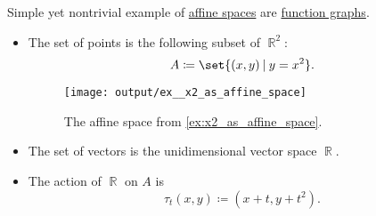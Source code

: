 \begin{example}\label{ex:x2_as_affine_space}
  Simple yet nontrivial example of \hyperref[def:affine_space]{affine spaces} are \hyperref[def:set_valued_map/graph]{function graphs}.
  \begin{itemize}
    \item The set of points is the following subset of \( \BbbR^2 \):
    \begin{equation*}
      A \coloneqq \set{ (x, y) \given y = x^2 }.
    \end{equation*}

    \begin{figure}[!ht]
      \centering
      \texttt{[image: output/ex\_\_x2\_as\_affine\_space]}
      \caption{The affine space from \cref{ex:x2_as_affine_space}.}\label{fig:ex:x2_as_affine_space}
    \end{figure}

    \item The set of vectors is the unidimensional vector space \( \BbbR \).

    \item The action of \( \BbbR \) on \( A \) is
    \begin{equation*}
      \tau_t(x, y) \coloneqq (x + t, y + t^2).
    \end{equation*}
  \end{itemize}
\end{example}

